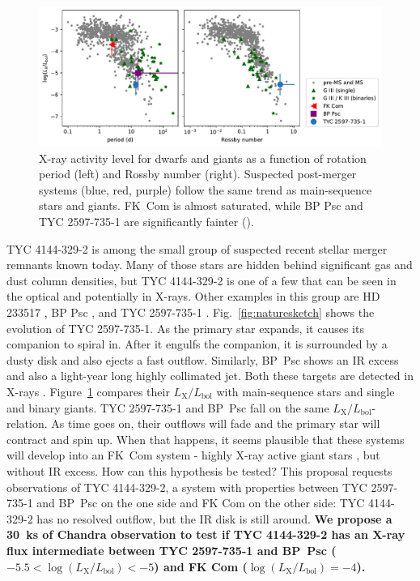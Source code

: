 \documentclass[letterpaper,11pt]{article}
\begin{document}
\begin{figure}
    \includegraphics[width=.7\textwidth]{lxlbol}
    \caption{X-ray activity level for dwarfs and giants as a function of rotation period (left) and Rossby number (right). Suspected post-merger systems (blue, red, purple) follow the same trend as main-sequence stars and giants.  FK~Com is almost saturated, while BP Psc and TYC 2597-735-1 are significantly fainter (\cite{2022arXiv220205424G}).
    \label{fig:lxlbol}}
\end{figure}

\vskip -0.1in
 TYC 4144-329-2 is among the  small group of suspected recent stellar merger remnants known today. Many of those stars are hidden behind significant gas and dust column densities, but 
 TYC 4144-329-2 is one of a few that can be seen in the optical \cite{2020RNAAS...4..238M} and potentially in X-rays. Other examples in this group are HD 233517 \cite{2003ApJ...582.1032J}, BP Psc \cite{Zuckerman_2008}, and  TYC 2597-735-1 \cite{2020Natur.587..387H}. Fig.~\ref{fig:naturesketch} shows the evolution of TYC 2597-735-1. As the primary star expands, it causes its companion to spiral in. After it engulfs the companion, it is surrounded by a dusty disk and also ejects a fast outflow. Similarly, BP~Psc shows an IR excess and also a light-year long highly collimated jet. Both these targets are detected in X-rays \cite{2010ApJ...719L..65K,2022arXiv220205424G}. Figure~\ref{fig:lxlbol} compares their $L_\mathrm{X}/L_\mathrm{bol}$ with main-sequence stars and single and binary giants. TYC 2597-735-1 and BP~Psc fall on the same $L_\mathrm{X}/L_\mathrm{bol}$-relation. As time goes on, their outflows will fade and the primary star will contract and spin up. When that happens, it seems plausible that these systems will develop into an FK~Com system - highly X-ray active giant stars \cite{2016ApJS..223....5A}, but without IR excess. How can this hypothesis be tested? This proposal requests observations of TYC 4144-329-2, a system with properties between 
TYC 2597-735-1 and BP~Psc on the one side and FK Com on the other side: TYC 4144-329-2 has no resolved outflow, but the IR disk is still around. \textbf{We propose a 30~ks of Chandra observation to test if TYC 4144-329-2 has an X-ray flux intermediate between TYC 2597-735-1 and BP~Psc  ($-5.5 < \log(L_\mathrm{X}/L_\mathrm{bol}) <-5$) and FK Com ($\log(L_\mathrm{X}/L_\mathrm{bol}) =-4$).}
\end{document}
